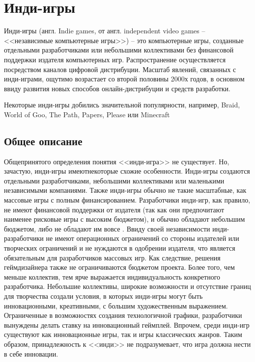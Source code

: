 \chapter{Инди-игры}
Инди-игры (англ. Indie games, от англ. independent video games -- <<независимые компьютерные игры>>) -- это
компьютерные игры, созданные отдельными разработчиками или небольшими коллективами без финансовой поддержки
издателя компьютерных игр. Распространение осуществляется посредством каналов цифровой дистрибуции. Масштаб
явлений, связанных с инди-играми, ощутимо возрастает со второй половины 2000х годов, в основном ввиду
развития новых способов онлайн-дистрибуции и средств разработки.

Некоторые инди-игры добились значительной популярности, например, Braid\cite{2.1}, World of Goo\cite{2.2}, 
The Path, Papers, Please или Minecraft\cite{2.3}

\section{Общее описание}
Общепринятого определения понятия <<инди-игра>> не существует\cite{2.5,2.7}. Но, зачастую, 
инди-игры имеютнекоторые схожие особенности. Инди-игры создаются отдельными разработчиками, небольшими коллективами или маленькими независимыми компаниями\cite{2.5}. Также инди-игры обычно не такие 
масштабные, как массовые игры с полным финансированием. Разработчики инди-игр, как правило, не 
имеют финансовой поддержки от издателя (так как они предпочитают наименее рисковые игры с высоким 
бюджетом\cite{2.10}), и обычно обладают небольшим бюджетом, либо не обладают им вовсе
\cite{2.5,2.7,2.12}. Ввиду своей независимости инди-разработчики не имеют операционных 
ограничений со стороны издателей или творческих ограничений\cite{2.5,2.13,2.7} и не нуждаются в
одобрении издателя, что является обязательным для разработчиков массовых игр. Как 
следствие, решения геймдизайнера также не ограничиваются бюджетом проекта\cite{2.13}. Более того, чем меньше 
коллектив, тем ярче выражается индивидуальность конкретного разработчика\cite{2.15}. Небольшие коллективы, 
широкие возможности и отсутствие границ для творчества создали условия, в которых инди-игры могут быть 
инновационными, креативными, с большим художественным выражением\cite{2.15,2.16,2.17,2.19}. 
Ограниченные в возможностях создания технологичной графики, разработчики вынуждены делать ставку на 
инновационный геймплей\cite{2.20}. Впрочем, среди инди-игр существуют как инновационные игры, так и игры 
классических жанров\cite{2.17}. Таким образом, принадлежность к <<инди>> не подразумевает, что игра должна 
нести в себе инновации\cite{2.21}.

